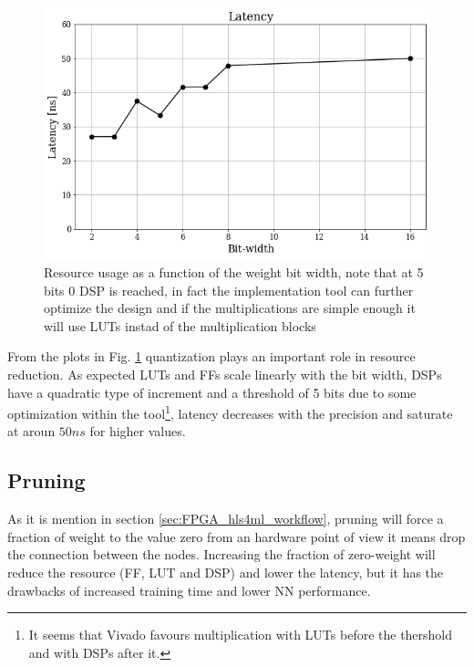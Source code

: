 \documentclass[../../main.tex]{subfiles}
\begin{document}
\begin{figure}[ht]
\begin{minipage}[b]{0.5\linewidth}
    \vspace{2ex}
  \end{minipage}%
  \begin{minipage}[b]{0.5\linewidth}
    \centering
    \includegraphics[width=.95\linewidth]{sections/05/Images/Quant_Lat_1ele.png}
    \vspace{2ex}
  \end{minipage}
  \caption{Resource usage as a function of the weight bit width, note that at 5 bits 0 DSP is reached, in fact the implementation tool can further optimize the design and if the multiplications are simple enough it will use LUTs instad of the multiplication blocks} 
  \label{fig:quantization_resource}
\end{figure}
  
From the plots in Fig. \ref{fig:quantization_resource} quantization plays an important role in resource reduction. As expected LUTs and FFs scale linearly with the bit width, DSPs have a quadratic type of increment and a threshold of 5 bits due to some optimization within the tool\footnote{It seems that Vivado favours multiplication with LUTs before the thershold and with DSPs after it.}, latency decreases with the precision and saturate at aroun $50ns$ for higher values.

 
\subsection{Pruning}
\label{sec:P2GT_Prune}

As it is mention in section \ref{sec:FPGA_hls4ml_workflow}, pruning will force a fraction of weight to the value zero from an hardware point of view it means drop the connection between the nodes. Increasing the fraction of zero-weight will reduce the resource (FF, LUT and DSP) and lower the latency, but it has the drawbacks of increased training time and lower NN performance.
\end{document}
